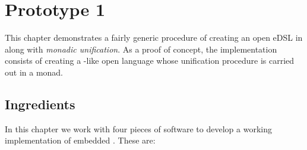 \documentclass[thesis-solanki.tex]{subfiles}
\begin{document}
\chapter{Prototype 1}{\label{proto1}}

This chapter demonstrates a fairly generic procedure of creating an open eDSL in
 along with \textit{monadic unification}.
As a proof of concept, the implementation consists of creating a -like open language whose
unification procedure is carried out in a monad.


\section{Ingredients}
In this chapter we work with four pieces of software to develop a working implementation of embedded . These are:
\end{document}
